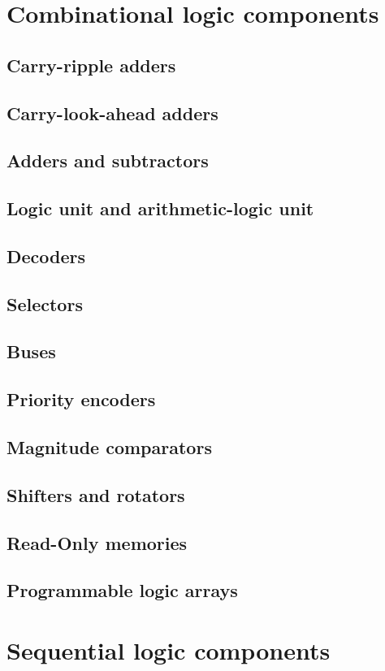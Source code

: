 \documentclass{report}
\begin{document}
\section{Combinational logic components}
\subsection{Carry-ripple adders}
\subsection{Carry-look-ahead adders}
\subsection{Adders and subtractors}
\subsection{Logic unit and arithmetic-logic unit}
\subsection{Decoders}
\subsection{Selectors}
\subsection{Buses}
\subsection{Priority encoders}
\subsection{Magnitude comparators}
\subsection{Shifters and rotators}
\subsection{Read-Only memories}
\subsection{Programmable logic arrays}
\section{Sequential logic components}
\end{document}
